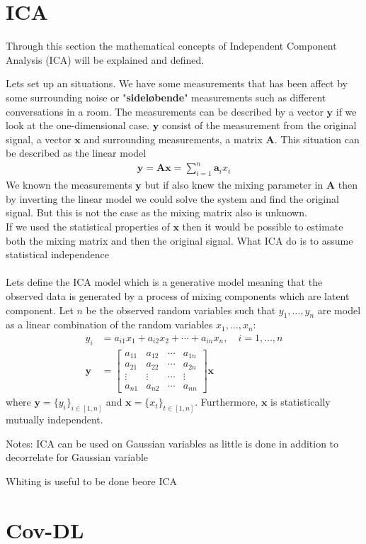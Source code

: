 \section{ICA}
Through this section the mathematical concepts of Independent Component Analysis (ICA) will be explained and defined.

Lets set up an situations. We have some measurements that has been affect by some surrounding noise or "\textbf{sideløbende}" measurements such as different conversations in a room. The measurements can be described by a vector $\mathbf{y}$ if we look at the one-dimensional case. $\mathbf{y}$ consist of the measurement from the original signal, a vector $\mathbf{x}$ and surrounding measurements, a matrix $\mathbf{A}$. This situation can be described as the linear model
\begin{align*}
\mathbf{y} = \mathbf{Ax} = \sum_{i=1}^n \mathbf{a}_i x_i
\end{align*}
We known the measurements $\mathbf{y}$ but if also knew the mixing parameter in $\mathbf{A}$ then by inverting the linear model we could solve the system and find the original signal. But this is not the case as the mixing matrix also is unknown.
\\
If we used the statistical properties of $\mathbf{x}$ then it would be possible to estimate both the mixing matrix and then the original signal. What ICA do is to assume statistical independence 
\\ \\
Lets define the ICA model which is a generative model meaning that the observed data is generated by a process of mixing components which are latent component. Let $n$ be the observed random variables such that $y_1, \dots, y_n$ are model as a linear combination of the random variables $x_1, \dots, x_n$:
\begin{align*}
y_i &= a_{i1} x_1 + a_{i2} x_2 + \cdots + a_{in} x_n, \quad i = 1, \dots, n \\
\mathbf{y} &= 
\begin{bmatrix}
a_{11} & a_{12} & \cdots & a_{1n} \\
a_{21} & a_{22} & \cdots & a_{2n} \\
\vdots & \vdots & \cdots & \vdots \\
a_{n1} & a_{n2} & \cdots & a_{nn}
\end{bmatrix}
\mathbf{x}
\end{align*}
where $\mathbf{y} = \{ y_i \}_{i \in [1,n]}$ and $\mathbf{x} = \{ x_t \}_{t \in [1,n]}$. Furthermore, $\mathbf{x}$ is statistically mutually independent.

Notes:
ICA can be used on Gaussian variables as little is done in addition to decorrelate for Gaussian variable

Whiting is useful to be done beore ICA

\section{Cov-DL}